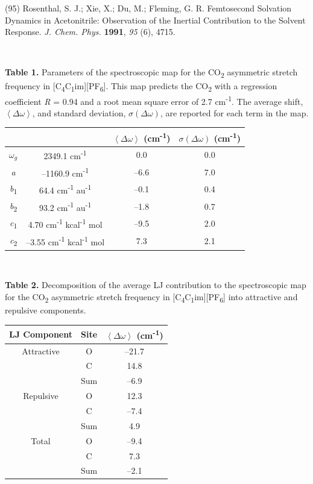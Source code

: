 \documentclass[]{article}
\begin{document}
(95) Rosenthal, S. J.; Xie, X.; Du, M.; Fleming, G. R. Femtosecond
Solvation Dynamics in Acetonitrile: Observation of the Inertial
Contribution to the Solvent Response. \emph{J. Chem. Phys.}
\textbf{1991}, \emph{95} (6), 4715.

\textbf{\\
}

\textbf{Table 1.} Parameters of the spectroscopic map for the
CO\textsubscript{2} asymmetric stretch frequency in
{[}C\textsubscript{4}C\textsubscript{1}im{]}{[}PF\textsubscript{6}{]}.
This map predicts the CO\textsubscript{2} with a regression coefficient
\emph{R} = 0.94 and a root mean square error of 2.7
cm\textsuperscript{-1}. The average shift,
\(\left\langle \Delta\omega \right\rangle\), and standard deviation,
\(\sigma(\Delta\omega)\), are reported for each term in the map.

\begin{longtable}[]{@{}cccc@{}}
\toprule
& & \(\left\langle \Delta\omega \right\rangle\) (cm\textsuperscript{-1}) &
\(\sigma(\Delta\omega)\) (cm\textsuperscript{-1})\tabularnewline
\midrule
\endhead
\(\omega_{g}\) & 2349.1 cm\textsuperscript{-1} & 0.0 &
0.0\tabularnewline
\emph{a} & --1160.9 cm\textsuperscript{-1} & --6.6 & 7.0\tabularnewline
\emph{b}\textsubscript{1} & 64.4 cm\textsuperscript{-1}
au\textsuperscript{-1} & --0.1 & 0.4\tabularnewline
\emph{b}\textsubscript{2} & 93.2 cm\textsuperscript{-1}
au\textsuperscript{-1} & --1.8 & 0.7\tabularnewline
\emph{c}\textsubscript{1} & 4.70 cm\textsuperscript{-1}
kcal\textsuperscript{-1} mol & --9.5 & 2.0\tabularnewline
\emph{c}\textsubscript{2} & --3.55 cm\textsuperscript{-1}
kcal\textsuperscript{-1} mol & 7.3 & 2.1\tabularnewline
\bottomrule
\end{longtable}

\textbf{\\
}

\textbf{Table 2.} Decomposition of the average LJ contribution to the
spectroscopic map for the CO\textsubscript{2} asymmetric stretch
frequency in
{[}C\textsubscript{4}C\textsubscript{1}im{]}{[}PF\textsubscript{6}{]}
into attractive and repulsive components.

\begin{longtable}[]{@{}ccc@{}}
\toprule
LJ Component & Site & \(\left\langle \Delta\omega \right\rangle\)
(cm\textsuperscript{-1})\tabularnewline
\midrule
\endhead
Attractive & O & --21.7\tabularnewline
& C & 14.8\tabularnewline
& Sum & --6.9\tabularnewline
Repulsive & O & 12.3\tabularnewline
& C & --7.4\tabularnewline
& Sum & 4.9\tabularnewline
Total & O & --9.4\tabularnewline
& C & 7.3\tabularnewline
& Sum & --2.1\tabularnewline
\bottomrule
\end{longtable}
\end{document}
